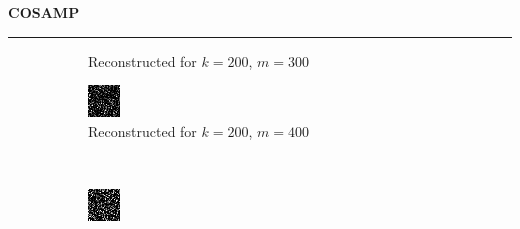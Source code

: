 \documentclass[a4paper,12pt]{article}
\newenvironment{solution}[2][]{%
    \begin{mdframed}[linecolor=blue!70!black, linewidth=2pt, roundcorner=10pt, backgroundcolor=yellow!10!white, skipabove=12pt, skipbelow=12pt]%
        \textbf{\large #2}
        \par\noindent\rule{\textwidth}{0.4pt}
}{
    \end{mdframed}
}
\begin{document}
\begin{solution}{COSAMP}
\begin{figure}[H]
\begin{subfigure}[t]{0.23\textwidth}
            \caption{Reconstructed for $k = 200$, $m = 300$}
        \end{subfigure}
        \begin{subfigure}[t]{0.23\textwidth}
            \centering
            \includegraphics[width=\textwidth]{../images/cosamp/Reconstructed_k_200_m_400.png}
            \caption{Reconstructed for $k = 200$, $m = 400$}
        \end{subfigure}\\
        \begin{subfigure}[t]{0.23\textwidth}
            \centering
            \includegraphics[width=\textwidth]{../images/cosamp/Reconstructed_k_200_m_500.png}

\end{subfigure}
\end{figure}
\end{solution}
\end{document}
